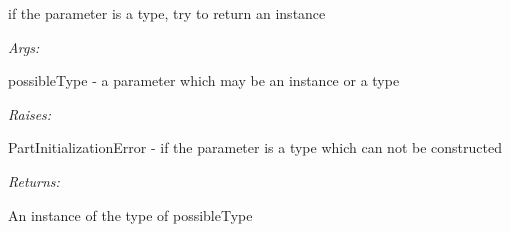 \documentclass[letterpaper,10pt,english]{sphinxmanual}
\begin{document}
\begin{fulllineitems}
\label{modules/index:aosb.core.checkIfTypeReturnInstance}
if the parameter is a type, try to return an instance

\begin{DUlineblock}{0em}
\item[] \emph{Args:}
\item[]
\begin{DUlineblock}{\DUlineblockindent}
\item[] possibleType - a parameter which may be an instance or a type
\end{DUlineblock}
\end{DUlineblock}

\begin{DUlineblock}{0em}
\item[] \emph{Raises:}
\item[]
\begin{DUlineblock}{\DUlineblockindent}
\item[] PartInitializationError - if the parameter is a type which can not be constructed
\end{DUlineblock}
\end{DUlineblock}

\begin{DUlineblock}{0em}
\item[] \emph{Returns:}
\item[]
\begin{DUlineblock}{\DUlineblockindent}
\item[] An instance of the type of possibleType
\end{DUlineblock}
\end{DUlineblock}

\end{fulllineitems}

\end{document}
